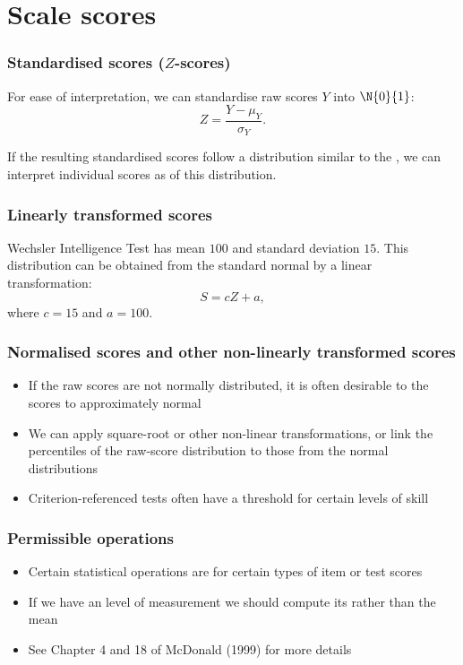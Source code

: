 \documentclass[compress]{beamer}\usepackage[]{graphicx}\usepackage[]{xcolor}
\begin{document}
\section{Scale scores}

\begin{frame}[fragile]
  \frametitle{Standardised scores ($Z$-scores)}
    For ease of interpretation, we can standardise raw scores $Y$ into $\N{0}{1}$:
      \[ Z =\frac{Y - \mu_Y}{\sigma_Y}. \]

    If the resulting standardised scores follow a distribution similar to the , we can interpret individual scores as  of this distribution.
\end{frame}


\begin{frame}[fragile]
  \frametitle{Linearly transformed scores}
    Wechsler Intelligence Test has mean $100$ and standard deviation $15$. This distribution can be obtained from the standard normal by a linear transformation:
      \[ S = cZ + a, \]
    where $c = 15$ and $a = 100$.
\end{frame}

\begin{frame}[fragile]
  \frametitle{Normalised scores and other non-linearly transformed scores}
    \begin{itemize}
      \item If the raw scores are not normally distributed, it is often desirable to  the scores to approximately normal
      \item We can apply square-root or other non-linear transformations, or link the percentiles of the raw-score distribution to those from the normal distributions
      \item Criterion-referenced tests often have a threshold for certain levels of skill
    \end{itemize}
\end{frame}

\begin{frame}[fragile]
  \frametitle{Permissible operations}
    \begin{itemize}
      \item Certain statistical operations are  for certain types of item or test scores
      \item If we have an  level of measurement we should compute its  rather than the mean
      \item See Chapter 4 and 18 of McDonald (1999) for more details
    \end{itemize}
\end{frame}
\end{document}
